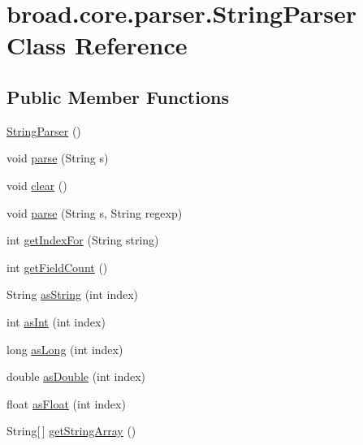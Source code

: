 \hypertarget{classbroad_1_1core_1_1parser_1_1_string_parser}{\section{broad.\+core.\+parser.\+String\+Parser Class Reference}
\label{classbroad_1_1core_1_1parser_1_1_string_parser}
}
\subsection*{Public Member Functions}
\begin{DoxyCompactItemize}
\item 
\hyperlink{classbroad_1_1core_1_1parser_1_1_string_parser_aa02fda8dd78bf419b8db9e0a6e523978}{String\+Parser} ()
\item 
void \hyperlink{classbroad_1_1core_1_1parser_1_1_string_parser_a331a1ca7ab3fa94abc1c53402aac4b60}{parse} (String s)
\item 
void \hyperlink{classbroad_1_1core_1_1parser_1_1_string_parser_aef4b94fbed7a71500a398fac0f7dd1de}{clear} ()
\item 
void \hyperlink{classbroad_1_1core_1_1parser_1_1_string_parser_a674f915e6da8529d20ae9f35d48e6cd5}{parse} (String s, String regexp)
\item 
int \hyperlink{classbroad_1_1core_1_1parser_1_1_string_parser_a41df20ecf6b5981300aad15764b572ea}{get\+Index\+For} (String string)
\item 
int \hyperlink{classbroad_1_1core_1_1parser_1_1_string_parser_ad5b185a9ef1e230a65e14c45c59a185f}{get\+Field\+Count} ()
\item 
String \hyperlink{classbroad_1_1core_1_1parser_1_1_string_parser_a9c3b693f78ab2220da12efa33cd3242c}{as\+String} (int index)
\item 
int \hyperlink{classbroad_1_1core_1_1parser_1_1_string_parser_a51bed2bfab3e94beac7737a9d01858b5}{as\+Int} (int index)
\item 
long \hyperlink{classbroad_1_1core_1_1parser_1_1_string_parser_af44432df97979d0534f3b4f43882a264}{as\+Long} (int index)
\item 
double \hyperlink{classbroad_1_1core_1_1parser_1_1_string_parser_aed7c90ec64b63bbf2f84bed861095f13}{as\+Double} (int index)
\item 
float \hyperlink{classbroad_1_1core_1_1parser_1_1_string_parser_ac1d2a44273b6dbf379eca05a187f3421}{as\+Float} (int index)
\item 
String\mbox{[}$\,$\mbox{]} \hyperlink{classbroad_1_1core_1_1parser_1_1_string_parser_ac388a4e2475ca305f1cd9ca4600e4d50}{get\+String\+Array} ()
\end{DoxyCompactItemize}
